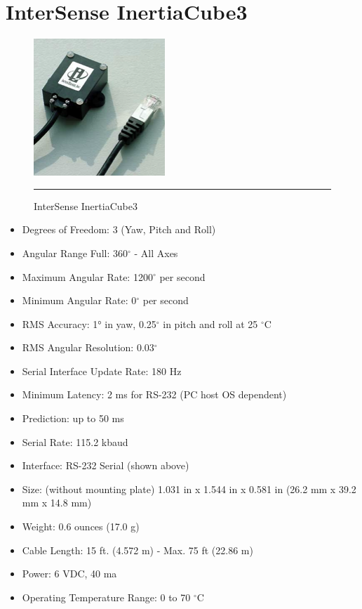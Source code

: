 \chapter{InterSense InertiaCube3}
\label{AppendixD}

\begin{figure}[htbp]
  \centering
    \includegraphics{./Primitives/inertiacube3.png}
    \rule{35em}{0.5pt}
  \caption[InterSense InertiaCube3]{InterSense InertiaCube3}
\end{figure}

\begin{itemize}
	\item Degrees of Freedom: 3 (Yaw, Pitch and Roll) 
	\item Angular Range Full: 360$^\circ$ - All Axes 
	\item Maximum Angular Rate: 1200$^\circ$ per second 
	\item Minimum Angular Rate: 0$^\circ$ per second 
	\item RMS Accuracy: 1° in yaw, 0.25$^\circ$ in pitch and roll at 25 $^\circ$C 
	\item RMS Angular Resolution: 0.03$^\circ$
	\item Serial Interface Update Rate: 180 Hz
	\item Minimum Latency: 2 ms for RS-232 (PC host OS dependent) 
	\item Prediction: up to 50 ms 
	\item Serial Rate: 115.2 kbaud 
	\item Interface: RS-232 Serial (shown above) 
	\item Size: (without mounting plate) 1.031 in x 1.544 in x 0.581 in (26.2 mm x 39.2 mm x 14.8 mm) 
	\item Weight: 0.6 ounces (17.0 g) 
	\item Cable Length: 15 ft. (4.572 m) - Max. 75 ft (22.86 m) 
	\item Power: 6 VDC, 40 ma 
	\item Operating Temperature Range: 0 to 70 $^\circ$C 
\end{itemize}
